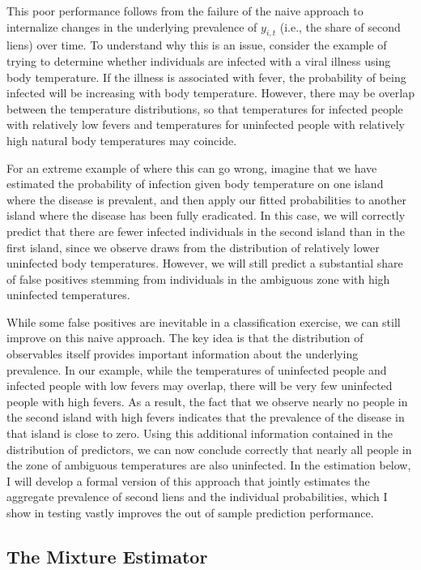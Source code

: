 \documentclass[letterpaper,12pt,usenames,dvipsnames]{article}
\theoremstyle{definition}
\begin{document}
This poor performance follows from the failure of the naive approach to internalize changes in the underlying prevalence of $y_{i,t}$ (i.e., the share of second liens) over time. To understand why this is an issue, consider the example of trying to determine whether individuals are infected with a viral illness using body temperature. If the illness is associated with fever, the probability of being infected will be increasing with body temperature. However, there may be overlap between the temperature distributions, so that temperatures for infected people with relatively low fevers and temperatures for uninfected people with relatively high natural body temperatures may coincide. 

For an extreme example of where this can go wrong, imagine that we have estimated the probability of infection given body temperature on one island where the disease is prevalent, and then apply our fitted probabilities to another island where the disease has been fully eradicated. In this case, we will correctly predict that there are fewer infected individuals in the second island than in the first island, since we observe draws from the distribution of relatively lower uninfected body temperatures. However, we will still predict a substantial share of false positives stemming from individuals in the ambiguous zone with high uninfected temperatures.

While some false positives are inevitable in a classification exercise, we can still improve on this naive approach. The key idea is that the distribution of observables itself provides important information about the underlying prevalence. In our example, while the temperatures of uninfected people and infected people with low fevers may overlap, there will be very few uninfected people with high fevers. As a result, the fact that we observe nearly no people in the second island with high fevers indicates that the prevalence of the disease in that island is close to zero. Using this additional information contained in the distribution of predictors, we can now conclude correctly that nearly all people in the zone of ambiguous temperatures are also uninfected. In the estimation below, I will develop a formal version of this approach that jointly estimates the aggregate prevalence of second liens and the individual probabilities, which I show in testing vastly improves the out of sample prediction performance.

\subsection{The Mixture Estimator}
\end{document}
